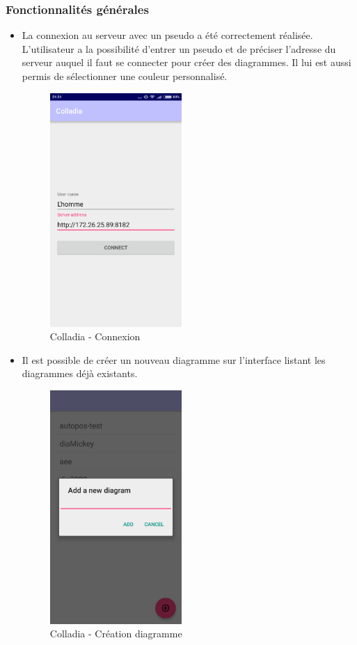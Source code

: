 \subsubsection{Fonctionnalités générales}
	\begin{itemize}
		\item La connexion au serveur avec un pseudo a été correctement réalisée. L'utilisateur a la possibilité d'entrer un pseudo et de préciser l'adresse du serveur auquel il faut se connecter pour créer des diagrammes. Il lui est aussi permis de sélectionner une couleur personnalisé. 
		\begin{figure}[!h]
			\centering
			\includegraphics[width=5cm]{img/screen/colladia_connexion}
			\caption{Colladia - Connexion}
		\end{figure}
		
		\item Il est possible de créer un nouveau diagramme sur l'interface listant les diagrammes déjà existants.
		\begin{figure}[!h]
			\centering
			\includegraphics[width=5cm]{img/screen/colladia_create_workspace}
			\caption{Colladia - Création diagramme}
		\end{figure}
		

\end{itemize}
